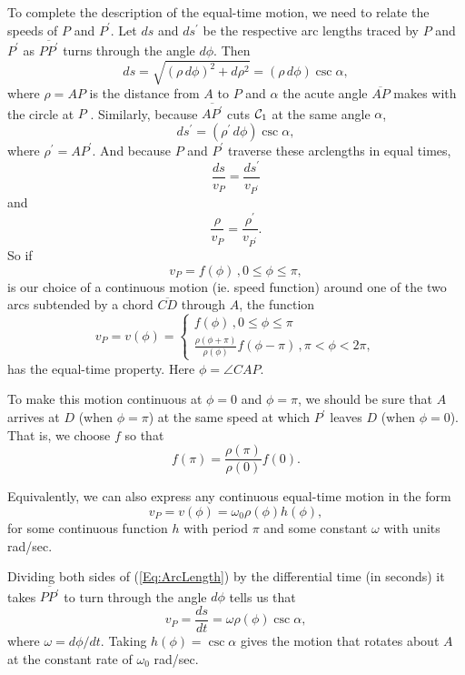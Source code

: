 \documentclass{ximera}
\begin{document}
To complete the description of the equal-time motion, we need to relate the speeds of $P$ and $P^\prime$. Let $ds$ and $ds^\prime$ be the respective arc lengths traced by $P$ and $P^\prime$ as $\overline{PP^\prime}$ turns through the angle $d\phi$. Then 
\begin{equation}
   ds =  \sqrt{(\rho \, d\phi)^2 + d\rho^2}   =   (\rho \, d\phi) \csc \alpha ,   \label{Eq:ArcLength}
\end{equation}
where $\rho = AP$ is the distance from $A$ to $P$ and $\alpha$ the acute angle $\overline{AP}$ makes with the circle at $P$ . Similarly, because $\overline{AP^\prime}$ cuts ${\cal C}_1$ at the same angle $\alpha$,
\begin{equation}
   ds^\prime =   (\rho^\prime \, d\phi) \csc \alpha ,  \label{Eq:ArcLength2}
\end{equation}
where $\rho^\prime = AP^\prime$. And because $P$ and $P^\prime$ traverse these arclengths in equal times,
\[
   \frac{ds}{v_P} = \frac{ds^\prime}{v_{P^\prime}}
\] 
and
\[
    \frac{\rho}{v_P} = \frac{\rho^\prime}{v_{P^\prime}} .
\]
So if 
\[
  v_P = f(\phi) \, , 0\leq \phi \leq \pi , 
\]
is our choice of a continuous motion (ie. speed function) around one of the two arcs subtended by a chord $\overline{CD}$ through $A$, the function
\[
   v_P = v(\phi)  = 
\begin{cases}
          f(\phi) \, , 0\leq \phi \leq \pi \\
         \frac{\rho (\phi + \pi)}{\rho (\phi)} f(\phi-\pi) \, , \pi < \phi < 2\pi ,
\end{cases}
\]
has the equal-time property. Here $\phi = \angle CAP$.

To make this motion continuous at $\phi=0$ and $\phi= \pi$, we should be sure that $A$ arrives at $D$ (when $\phi=\pi$) at the same speed at which $P^\prime$ leaves $D$ (when $\phi = 0$). That is, we choose $f$ so that 
\[
   f(\pi) =  \frac{\rho(\pi)}{\rho(0)} f(0) .
\]


Equivalently, we can also express any continuous equal-time motion in the form
\[
      v_P = v(\phi) = \omega_0 \rho (\phi) h(\phi) ,
\]
for some continuous function $h$ with period $\pi$ and some constant $\omega$ with units rad/sec.  

Dividing both sides of (\ref{Eq:ArcLength}) by the differential time (in seconds) it takes $\overline{PP^\prime}$ to turn through the angle $d\phi$ tells us that 
\[
    v_P = \frac{ds}{dt} = \omega \rho (\phi) \csc \alpha , 
\]
where $\omega  = d\phi/dt$. Taking $h(\phi) = \csc \alpha$ gives the motion that rotates about $A$ at the constant rate of $\omega_0$ rad/sec.
\end{document}
